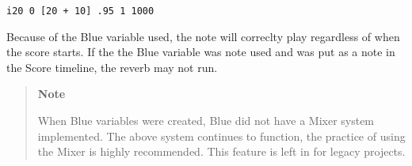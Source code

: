 \begin{verbatim}
i20 0 [20 + 10] .95 1 1000
\end{verbatim}

Because of the Blue variable used, the note will correclty play
regardless of when the score starts. If the the Blue variable was note
used and was put as a note in the Score timeline, the reverb may not
run.

\begin{quote}
\textbf{Note}

When Blue variables were created, Blue did not have a Mixer system
implemented. The above system continues to function, the practice of
using the Mixer is highly recommended. This feature is left in for
legacy projects.
\end{quote}
